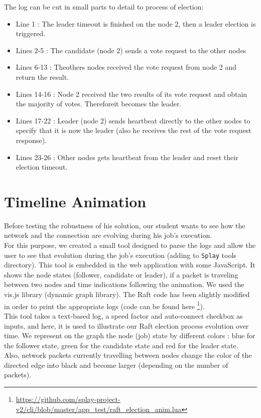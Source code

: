 \documentclass{eplmastersthesis}
\begin{document}
        The log can be cut in small parts to detail to process of election:
        \begin{itemize}
          \item Line 1 : The leader timeout is finished on the node 2, then a leader election is triggered.
          \item Lines 2-5 : The candidate (node 2) sends a vote request to the other nodes
          \item Lines 6-13 : Theothers nodes received the vote request from node 2 and return the result.
          \item Lines 14-16 : Node 2 received the two results of its vote request and obtain the majority of votes.
          Thereforeit becomes the leader.
          \item Lines 17-22 : Leader (node 2) sends heartbeat directly to the other nodes to specify that it is now the leader
          (also he receives the rest of the vote request response).
          \item Lines 23-26 : Other nodes gets heartbeat from the leader and reset their election timeout.
        \end{itemize}

    \section{Timeline Animation}

      Before testing the robustness of his solution, our student wants to
      see how the network and the connection are evolving during his job's
      execution.\\
      For this purpose, we created a small tool designed to parse the
      logs and allow the user to see that evolution during the job's
      execution (adding to \texttt{Splay} tools directory).
      This tool is embedded in the web application with some
      JavaScript. It shows the node states (follower, candidate or leader),
      if a packet is traveling between two nodes and time
      indications following the animation. We used the vis.js library
      \cite{VisJS} (dynamic graph library). The Raft code has been slightly
      modified in order to print the appropriate logs (code can be found here
      \footnote{\url{https://github.com/splay-project-v2/cli/blob/master/app_test/raft_election_anim.lua}}).\\

      This tool takes a text-based log, a speed factor and auto-connect
      checkbox as inputs, and here, it is used to illustrate our Raft election
      process evolution over time. We represent on the graph the node (job)
      state by different colors : blue for the follower state,
      green for the candidate state and red for the leader state.\\
      Also, network packets currently travelling between nodes change the color
      of the directed edge into black and become larger (depending on the
      number of packets).\\
\end{document}
